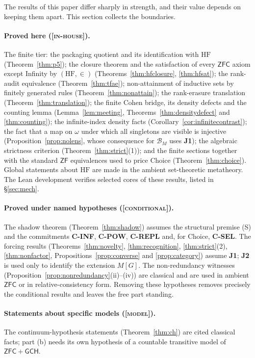 \documentclass[11pt]{article}
\newcommand{\HF}{\mathrm{HF}}                 \newcommand{\rank}{\operatorname{rank}}
\newcommand{\gradetag}[1]{\textnormal{\textsc{[#1]}}}
\newcommand{\inhouse}{\gradetag{in-house}}
\newcommand{\condg}{\gradetag{conditional}}
\newcommand{\modelg}{\gradetag{model}}
\theoremstyle{definition}
\begin{document}
The results of this paper differ sharply in strength, and their value depends on keeping them
apart. This section collects the boundaries.

\paragraph{Proved here (\inhouse).} The finite tier: the packaging quotient and its
identification with $\HF$ (Theorem~\ref{thm:p5}); the closure theorem and the satisfaction of
every $\mathsf{ZFC}$ axiom except Infinity by $(\HF,\in)$ (Theorems~\ref{thm:hfclosure},
\ref{thm:hfsat}); the rank-audit equivalence (Theorem~\ref{thm:tfae}); non-attainment of
inductive sets by finitely generated rules (Theorem~\ref{thm:nonattain}); the rank-erasure
translation (Theorem~\ref{thm:translation}); the finite Cohen bridge, its density defects and the
counting lemma (Lemma~\ref{lem:meeting}, Theorems~\ref{thm:densitydefect} and \ref{thm:counting});
the infinite-index density facts (Corollary~\ref{cor:infinitecontrast}); the fact that a map on
$\omega$ under which all singletons are visible is injective (Proposition~\ref{prop:nolens}, whose
consequence for $\mathcal B_M$ uses \textbf{J1}); the algebraic strictness
criterion (Theorem~\ref{thm:strict}(1)); and the finite sections together with the standard
$\mathsf{ZF}$ equivalences used to price Choice (Theorem~\ref{thm:choice}). Global statements about
$\HF$ are made in the ambient set-theoretic metatheory. The Lean development verifies selected
cores of these results, listed in \S\ref{sec:mech}.

\paragraph{Proved under named hypotheses (\condg).} The shadow theorem
(Theorem~\ref{thm:shadow}) assumes the structural premise (S) and the commitments
\textbf{C-INF}, \textbf{C-POW}, \textbf{C-REPL} and, for Choice, \textbf{C-SEL}. The forcing
results (Theorems~\ref{thm:novelty}, \ref{thm:recognition}, \ref{thm:strict}(2),
\ref{thm:nonfactor}, Propositions~\ref{prop:converse} and \ref{prop:category}) assume \textbf{J1};
\textbf{J2} is used only to identify the extension $M[G]$. The non-redundancy witnesses
(Proposition~\ref{prop:nonredundancy}(ii)--(iv)) are classical and are used in ambient
$\mathsf{ZFC}$ or in relative-consistency form. Removing these hypotheses removes precisely the
conditional results and leaves the free part standing.

\paragraph{Statements about specific models (\modelg).} The continuum-hypothesis statements
(Theorem~\ref{thm:ch}) are cited classical facts; part (b) needs its own hypothesis of a countable
transitive model of $\mathsf{ZFC}+\mathsf{GCH}$.
\end{document}
